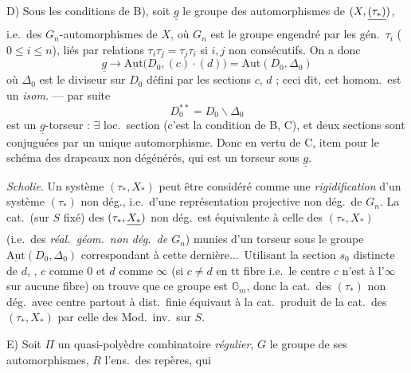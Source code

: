 \documentclass[11pt,a4paper]{article}
\begin{document}
D) Sous les conditions de B), soit \struck{\ill{}} $\underline{g}$ le groupe des automorphismes de $(X, \struck{(\tau_*)})$, i.e.\ des $G_n$-automorphismes de $X$, où $G_n$ est le groupe engendré par les gén.\ $\tau_i$ ($0 \leq i \leq n$), liés par relations $\tau_i \tau_j = \tau_j \tau_i$ si $i, j$ non consécutifs. On a donc
\[
\underline{g} \longrightarrow \underline{\mathrm{Aut}}\bigl(D_0, (c) \cdot (d)\bigr) = \mathrm{Aut}(D_0, \Delta_0)
\]
où $\Delta_0$ est le diviseur sur $D_0$ défini par les sections $c$, $d$
; ceci dit, cet homom.\ est un \emph{isom.} --- par suite
\[
D_0^{**} = D_0 \smallsetminus \Delta_0
\]
est un $\underline{g}$-torseur : $\exists$ loc.\ section (c'est la condition de B, C), et deux sections sont conjuguées par un unique automorphisme. Donc  en vertu de C, item pour le schéma des \add{$(\tau_*)$-}drapeaux non dégénérés, qui est un torseur sous $\underline{g}$.


\emph{Scholie}. Un système $(\tau_*, X_*)$  peut être considéré comme une \emph{rigidification} d'un système $(\tau_*)$ non dég., i.e.\ d'une représentation projective non dég.\ de $G_n$. La cat.\ (sur $S$ fixé) des $(\tau_*, \struck{X_*})$ non dég.\ est équivalente à celle des $(\tau_*, X_*)$ (i.e.\ des \emph{réal.\ géom.\ non dég.\ de $G_n$}) munies d'un torseur sous le groupe  $\underline{\mathrm{Aut}}(D_0, \Delta_0)$  correspondant à cette dernière$\dots$\ Utilisant la section $s_0$ distincte de $d$,   \struck{\ill{}}, $c$ comme $0$ et $d$ comme $\infty$ (si $c \neq d$ en tt fibre i.e.\ le centre $c$ n'est à l'$\infty$ sur aucune fibre) on trouve que ce groupe est $\mathbb{G}_m$, donc   la cat.\ des $(\tau_*)$ non dég.\ avec centre partout à dist.\ finie équivaut à la cat.\ produit de la cat.\ des $(\tau_*, X_*)$ par celle des Mod.\ inv.\ sur $S$.

E) Soit $\Pi$ un quasi-polyèdre combinatoire \emph{régulier}, $G$ le groupe de ses automorphismes, $R$ l'ens.\ des repères, qui
\end{document}
